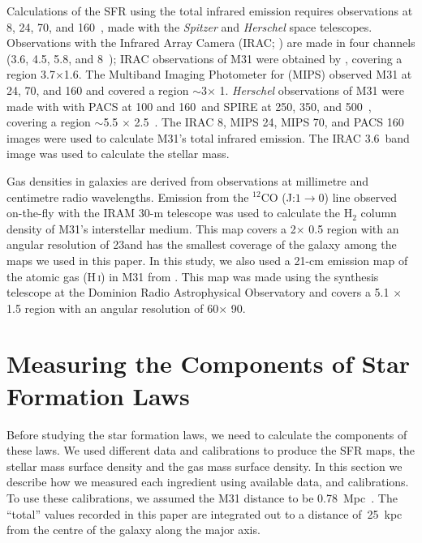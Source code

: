 Calculations of the SFR using the total infrared emission requires observations at 8, 24, 70, and 160~\um, made
with the {\em Spitzer} \citep{Werner04} and {\em Herschel} \citep{Pilbratt10}  space telescopes. 
Observations with the Infrared Array Camera (IRAC; \citep{Fazio04}) are made in four channels (3.6, 4.5, 5.8, and 8~\um); IRAC observations of M31 were obtained by \citet{Barmby06}, covering a region 3\degr.7$\times $1\degr.6. 
The Multiband Imaging Photometer for \Spitzer (MIPS) observed M31 at 24, 70, and 160 \um and covered a region $\sim 3$\degr $\times$ 1\degr \citep{Gordon06}. {\em Herschel} observations of M31 were made with with PACS \citep[Photodetector Array Camera and Spectrometer;][]{Poglitsch10}  at 100 and 160~\um and SPIRE  \citep[Spectral and Photometric Imaging Receiver;][]{Griffin10} 
at 250, 350, and 500~\um, covering a region  $\sim$5\degr.5 $\times$ 2\degr.5~\citep{Fritz12}.
The IRAC 8, MIPS 24, MIPS 70, and PACS 160 images were used to calculate M31's total infrared emission. 
The IRAC 3.6~\um band image was used to calculate the stellar mass. 

Gas densities in galaxies are derived from observations at millimetre and centimetre radio wavelengths.
Emission from the $^{12}$CO (J:$1\rightarrow0$) line observed on-the-fly with the IRAM 30-m telescope \citep{Nieten06} was used to calculate the H$_2$ column density of M31's interstellar medium. This map covers a 2\degr $\times$ 0\degr.5 region with an angular resolution of 23\arcsec and has the smallest coverage of the galaxy among the maps we used in this paper. In this study, we also used a 21-cm emission map of the atomic gas (H\,{\textsc i}) in M31 from \citet{Chemin09}. This map was made using the synthesis telescope at the Dominion Radio Astrophysical Observatory and covers a 5\degr.1 $\times$ 1\degr.5 region with an angular resolution of 60\arcsec $\times$ 90\arcsec.
\section{Measuring the Components of Star Formation Laws}
Before studying the star formation laws, we need to calculate the components of these laws. We used different data and calibrations to produce the SFR maps, the stellar mass surface density and the gas mass surface density. In this section we describe how we measured each ingredient using available data, and calibrations. To use these calibrations, we assumed the M31 distance to be 0.78~Mpc~\citep{McConnachie05}. The ``total'' values recorded in this paper are integrated out to a distance of~25~kpc from the centre of the galaxy along the major axis. 

